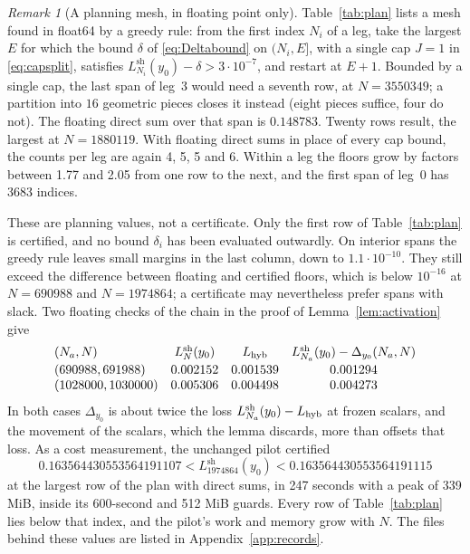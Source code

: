 \documentclass[11pt]{article}
\theoremstyle{remark}
\newtheorem{remark}[theorem]{Remark}
\numberwithin{equation}{section}
\begin{document}
\begin{remark}[A planning mesh, in floating point only]\label{rem:plan}
Table~\ref{tab:plan} lists a mesh found in float64 by a greedy rule: from
the first index $N_i$ of a leg, take the largest $E$ for which the bound
$\delta$ of \eqref{eq:Deltabound} on $(N_i,E]$, with a single cap $J=1$ in
\eqref{eq:capsplit}, satisfies $L^{\mathrm{sh}}_{N_i}(y_0)-\delta>3\cdot10^{-7}$,
and restart at $E+1$.
Bounded by a single cap, the last span of leg~3 would need a seventh row,
at $N=3550349$; a partition into $16$ geometric pieces closes it instead
(eight pieces suffice, four do not). The floating direct sum over that
span is $0.148783$. Twenty rows result, the largest at $N=1880119$. With
floating direct sums in place of every cap bound, the counts per leg are
again 4, 5, 5 and 6. Within a leg the floors grow by factors between
1.77 and 2.05 from one row to the next, and the first span of leg~0 has
3683 indices.

These are planning values, not a certificate. Only the first row of
Table~\ref{tab:plan} is certified, and no bound $\delta_i$ has been
evaluated outwardly. On
interior spans the greedy rule leaves small margins in the last column,
down to $1.1\cdot10^{-10}$. They still exceed the difference between
floating and certified floors, which is below $10^{-16}$ at $N=690988$
and $N=1974864$; a certificate may nevertheless prefer spans with slack.
Two floating checks of the chain in the proof of
Lemma~\ref{lem:activation} give
\[
 \begin{array}{lccc}
 (N_a,N) & L^{\mathrm{sh}}_N(y_0) & L_{\rm hyb} &
 L^{\mathrm{sh}}_{N_a}(y_0)-\Delta_{y_0}(N_a,N)\\[2pt]
 (690988,691988) & 0.002152 & 0.001539 & 0.001294\\
 (1028000,1030000) & 0.005306 & 0.004498 & 0.004273
 \end{array}
\]
In both cases $\Delta_{y_0}$ is about twice the loss
$L^{\mathrm{sh}}_{N_a}(y_0)-L_{\rm hyb}$ at frozen scalars, and the
movement of the scalars, which the lemma discards, more than offsets that
loss. As a cost measurement, the unchanged pilot certified
\[
 0.163564430553564191107<L^{\mathrm{sh}}_{1974864}(y_0)
 <0.163564430553564191115
\]
at the largest row of the plan with direct sums, in 247 seconds with a
peak of 339 MiB, inside its 600-second and 512 MiB guards. Every row of
Table~\ref{tab:plan} lies below that index, and the pilot's work and
memory grow with $N$. The files behind these values are listed in
Appendix~\ref{app:records}.
\end{remark}
\end{document}
